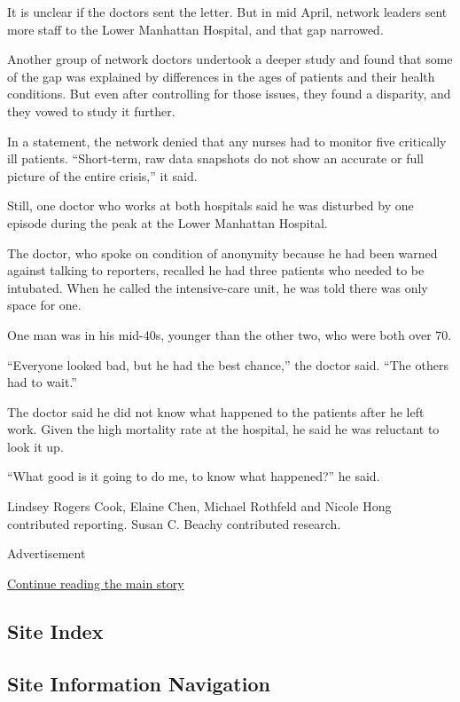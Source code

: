 It is unclear if the doctors sent the letter. But in mid April, network
leaders sent more staff to the Lower Manhattan Hospital, and that gap
narrowed.

Another group of network doctors undertook a deeper study and found that
some of the gap was explained by differences in the ages of patients and
their health conditions. But even after controlling for those issues,
they found a disparity, and they vowed to study it further.

In a statement, the network denied that any nurses had to monitor five
critically ill patients. ``Short-term, raw data snapshots do not show an
accurate or full picture of the entire crisis,'' it said.

Still, one doctor who works at both hospitals said he was disturbed by
one episode during the peak at the Lower Manhattan Hospital.

The doctor, who spoke on condition of anonymity because he had been
warned against talking to reporters, recalled he had three patients who
needed to be intubated. When he called the intensive-care unit, he was
told there was only space for one.

One man was in his mid-40s, younger than the other two, who were both
over 70.

``Everyone looked bad, but he had the best chance,'' the doctor said.
``The others had to wait.''

The doctor said he did not know what happened to the patients after he
left work. Given the high mortality rate at the hospital, he said he was
reluctant to look it up.

``What good is it going to do me, to know what happened?'' he said.

Lindsey Rogers Cook, Elaine Chen, Michael Rothfeld and Nicole Hong
contributed reporting. Susan C. Beachy contributed research.

Advertisement

\protect\hyperlink{after-bottom}{Continue reading the main story}

\hypertarget{site-index}{%
\subsection{Site Index}\label{site-index}}

\hypertarget{site-information-navigation}{%
\subsection{Site Information
Navigation}\label{site-information-navigation}}

